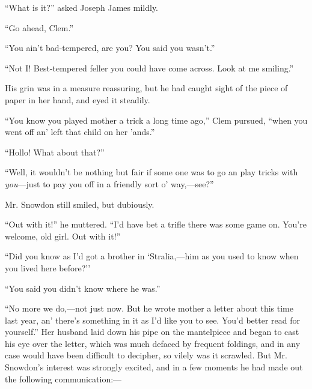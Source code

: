 {}``What is it?'' asked Joseph James mildly.

``Go ahead, Clem.''

``You ain't bad-tempered, are you? You said you wasn't.''

``Not I! Best-tempered feller you could have come across. Look at me
smiling.''

His grin was in a measure reassuring, but he had caught sight of the
piece of paper in her hand, and eyed it steadily.

``You know you played mother a trick a long time ago,'' Clem pursued,
``when you went off an' left that child on her 'ands.''

``Hollo! What about that?''

``Well, it wouldn't be nothing but fair if some one was to go an play
tricks with \emph{you}---just to pay you off in a friendly sort o'
way,---see?''

Mr. Snowdon still smiled, but dubiously.

``Out with it!'' he muttered. ``I'd have bet a trifle there was some
game on. You're welcome, old girl. Out with it!''

``Did you know as I'd got a brother in `Stralia,---him as you used to
know when you lived here before?''

{}``You said you didn't know where he was.''

``No more we do,---not just now. But he wrote mother a letter about this
time last year, an' there's something in it as I'd like you to see.
You'd better read for yourself.'' Her husband laid down his pipe on the
mantelpiece and began to cast his eye over the letter, which was much
defaced by frequent foldings, and in any case would have been difficult
to decipher, so vilely was it scrawled. But Mr. Snowdon's interest was
strongly excited, and in a few moments he had made out the following
communication:---

